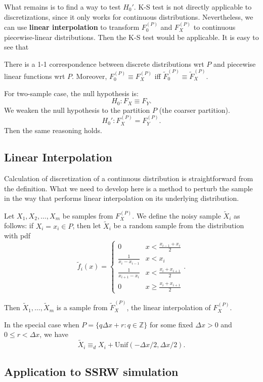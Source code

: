 What remains is to find a way to test $H_0'$. K-S test is not directly applicable to discretizations, since it only works for continuous distributions. Nevertheless, we can use \textbf{linear interpolation} to transform $F_0^{(P)}$ and $F_X^{(P)}$ to continuous piecewise-linear distributions. Then the K-S test would be applicable. It is easy to see that

\begin{claim}
	There is a 1-1 correspondence between discrete distributions wrt $P$ and piecewise linear functions wrt $P$. Moreover, $F_0^{(P)} \equiv F_X^{(P)}$ iff $\tilde F_0^{(P)} \equiv \tilde F_X^{(P)}$.
\end{claim}

For two-sample case, the null hypothesis is:
\[
	H_0: F_X \equiv F_Y
.\] 
We weaken the null hypothesis to the partition $P$ (the coarser partition).
\[
	H_0': F_X^{(P)} = F_Y^{(P)}
.\] 
Then the same reasoning holds. 

\subsection*{Linear Interpolation}
Calculation of discretization of a continuous distribution is straightforward from the definition. What we need to develop here is a method to perturb the sample in the way that performs linear interpolation on its underlying distribution.

Let $X_1, X_2, \ldots, X_m$ be samples from $F_X^{(P)}$. We define the noisy sample $\tilde X_i$ as follows: if $X_i = x_i \in P$, then let $\tilde X_i$ be a random sample from the distribution with pdf
\[
	\tilde f_i (x) = \begin{cases}
		0 & x < \frac{x_{i-1} + x_i}{2}\\
		\frac{1}{x_i - x_{i-1}} & x < x_i \\
		\frac{1}{x_{i+1} - x_{i}} & x < \frac{x_i + x_{i+1}}{2} \\
		0 & x \ge \frac{x_i + x_{i+1}}{2}
	\end{cases}
.\] 

Then $\tilde X_1, \ldots, \tilde X_m$ is a sample from $\tilde F_X^{(P)}$, the linear interpolation of $F_X^{(P)}$.

In the special case when $P = \{q \Delta x + r: q \in \mathbb{Z}\} $ for some fixed $\Delta x>0$ and $0\le r < \Delta x$, we have
\[
	\tilde X_i \equiv_d X_i + \text{Unif}(-\Delta x / 2, \Delta x / 2)
.\] 

\subsection*{Application to SSRW simulation}

